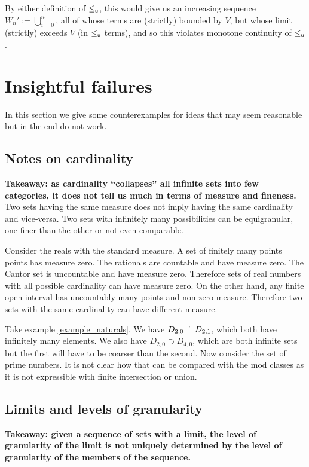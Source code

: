 \documentclass[10pt, onecolumn, longbibliography, nofootinbib]{revtex4-2}
\begin{document}
By either definition of $\leq_{\mathsf{u}}$, this would give us an increasing sequence $W_n' := \bigcup\limits_{i=0}^n$, all of whose terms are (strictly) bounded by $V$, but whose limit (strictly) exceeds $V$ (in $\leq_{\mathsf{u}}$ terms), and so this violates monotone continuity of $\leq_{\mathsf{u}}$. 

\section{Insightful failures}

In this section we give some counterexamples for ideas that may seem reasonable but in the end do not work.

\subsection{Notes on cardinality}

\textbf{Takeaway: as cardinality ``collapses'' all infinite sets into few categories, it does not tell us much in terms of measure and fineness.} Two sets having the same measure does not imply having the same cardinality and vice-versa. Two sets with infinitely many possibilities can be equigranular, one finer than the other or not even comparable.

Consider the reals with the standard measure. A set of finitely many points points has measure zero. The rationals are countable and have measure zero. The Cantor set is uncountable and have measure zero. Therefore sets of real numbers with all possible cardinality can have measure zero. On the other hand, any finite open interval has uncountably many points and non-zero measure. Therefore two sets with the same cardinality can have different measure.

Take example \ref{example_naturals}. We have $D_{2,0} \doteq D_{2,1}$, which both have infinitely many elements. We also have $D_{2,0} \supset D_{4,0}$, which are both infinite sets but the first will have to be coarser than the second. Now consider the set of prime numbers. It is not clear how that can be compared with the mod classes as it is not expressible with finite intersection or union.

\subsection{Limits and levels of granularity}

\textbf{Takeaway: given a sequence of sets with a limit, the level of granularity of the limit is not uniquely determined by the level of granularity of the members of the sequence.}
\end{document}
